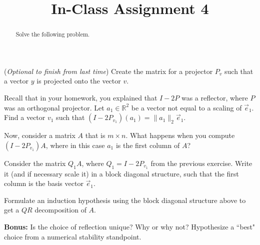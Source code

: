 \documentclass{ximera}
\begin{document}
    \title{In-Class Assignment 4}
    
    \begin{abstract} Solve the following problem.
    \end{abstract}
    \maketitle


\begin{exercise} (\textit{Optional to finish from last time})
     Create the matrix for a projector $P_v$ such that a vector $y$ is projected onto the vector $v$.
\end{exercise}

\begin{exercise}
Recall that in your homework, you explained that $I-2P$ was a reflector, where $P$ was an orthogonal projector.  Let $a_1\in \mathbb{R}^2$ be a vector not equal to a scaling of $\vec{e}_1$.  Find a vector $v_1$ such that $(I-2P_{v_1})(a_1) = \|a_1\|_2\vec{e}_1$. 
\end{exercise}

\begin{exercise}
    Now, consider a matrix $A$ that is $m \times n$.  What happens when you compute $(I-2P_{v_1})A$, where in this case $a_1$ is the first column of $A$?
\end{exercise}

\begin{exercise}
    Consider the matrix $Q_1A$, where $Q_1 = I-2P_{v_1}$ from the previous exercise.  Write it (and if necessary scale it) in a block diagonal structure, such that the first column is the basis vector $\vec{e}_1$.
\end{exercise}

\begin{exercise}
    Formulate an induction hypothesis using the block diagonal structure above to get a $QR$ decomposition of $A$.
\end{exercise}

\textbf{Bonus:}  Is the choice of reflection unique?  Why or why not?  Hypothesize a ``best" choice from a numerical stability standpoint.
\end{document}
